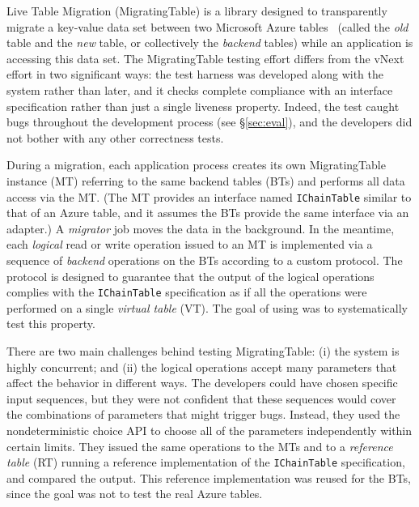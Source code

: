 %
Live Table Migration (MigratingTable) is a library designed to transparently migrate a key-value data set between two Microsoft Azure tables~\cite{azure-table} (called the \emph{old} table and the \emph{new} table, or collectively the \emph{backend} tables) while an application is accessing this data set. The MigratingTable testing effort differs from the vNext effort in two significant ways: the \psharp test harness was developed along with the system rather than later, and it checks complete compliance with an interface specification rather than just a single liveness property. Indeed, the \psharp test caught bugs throughout the development process (see \S\ref{sec:eval}), and the developers did not bother with any other correctness tests.

During a migration, each application process creates its own MigratingTable instance (MT) referring to the same backend tables (BTs) and performs all data access via the MT. (The MT provides an interface named \texttt{IChainTable} similar to that of an Azure table, and it assumes the BTs provide the same interface via an adapter.) A \emph{migrator} job moves the data in the background. In the meantime, each \emph{logical} read or write operation issued to an MT is implemented via a sequence of \emph{backend} operations on the BTs according to a custom protocol. The protocol is designed to guarantee that the output of the logical operations complies with the \texttt{IChainTable} specification as if all the operations were performed on a single \emph{virtual table} (VT). The goal of using \psharp was to systematically test this property.

There are two main challenges behind testing MigratingTable: (i) the system is highly concurrent; and (ii) the logical operations accept many parameters that affect the behavior in different ways. The developers could have chosen specific input sequences, but they were not confident that these sequences would cover the combinations of parameters that might trigger bugs. Instead, they used the \psharp nondeterministic choice API to choose all of the parameters independently within certain limits. They issued the same operations to the MTs and to a \emph{reference table} (RT) running a reference implementation of the \texttt{IChainTable} specification, and compared the output. This reference implementation was reused for the BTs, since the goal was not to test the real Azure tables.

